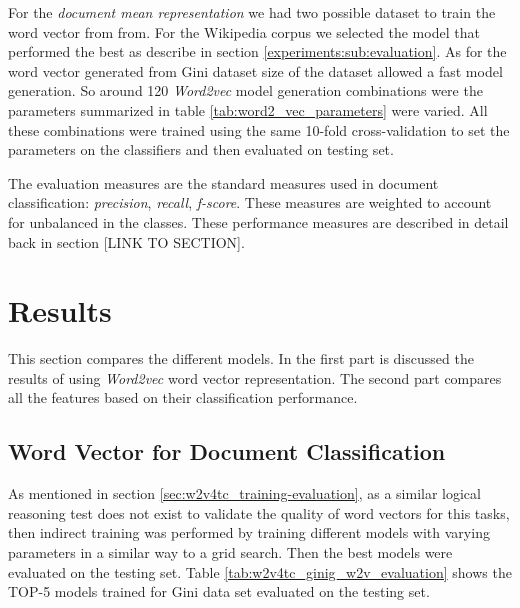 For the \textit{document mean representation} we had two possible dataset to
train the word vector from from. For the Wikipedia corpus we selected the model that
performed the best as describe in section \ref{experiments:sub:evaluation}. 
As for the word vector generated from Gini dataset 
size of the dataset  allowed a fast model generation. So around 120
\textit{Word2vec} model generation  combinations were the parameters
summarized in table \ref{tab:word2_vec_parameters} were varied. All these combinations
were trained using the same 10-fold cross-validation to set the parameters on
the classifiers and then evaluated on testing set.


The evaluation measures are the standard measures used in document
classification: \textit{precision}, \textit{recall}, \textit{f-score}. These
measures are  weighted to account for unbalanced in the classes. These
performance measures are described in detail back in section [LINK TO SECTION].




\section{Results}
\label{sec:w2v4tc_results}


This section compares the different models. In the first part is discussed
the results of using \textit{Word2vec} word vector representation. The second
part compares all the features based on their classification performance.


\subsection{Word Vector for Document Classification}
\label{sec:w2v4tc_w2v_results}

As mentioned in section \ref{sec:w2v4tc_training-evaluation}, as a similar
logical reasoning test does not exist to validate the quality of word vectors
for this tasks, then indirect training was performed by training different
models with varying parameters in a similar way to a grid search. Then the
best models  were evaluated on the testing set. Table \ref{tab:w2v4tc_ginig_w2v_evaluation} shows the TOP-5
models  trained for Gini  data set evaluated on the testing set.  



